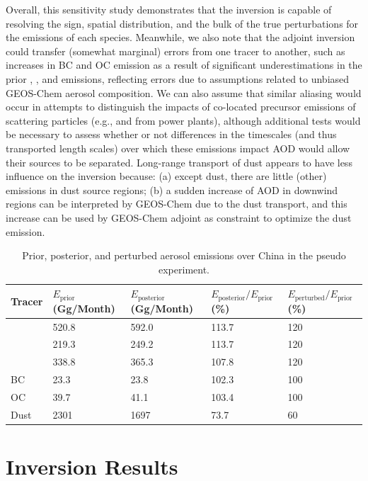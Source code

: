  Overall, this sensitivity study demonstrates that the inversion is capable of resolving the sign,
 spatial distribution, and the bulk of the true perturbations for the emissions of each species.
 Meanwhile, we also note that the adjoint inversion could transfer (somewhat marginal) errors
 from one tracer to another, such as increases in BC and OC emission 
 as a result of significant underestimations in the prior , , and  emissions,
 reflecting errors due to assumptions related to unbiased GEOS-Chem aerosol composition.
 We can also assume that similar aliasing would occur in attempts 
 to distinguish the impacts of co-located precursor emissions of scattering particles
 (e.g.,  and  from power plants),
 although additional tests would be necessary to assess whether or not differences 
 in the timescales (and thus transported length scales) 
 over which these emissions impact AOD would allow their sources to be separated.
 Long-range transport of dust appears to have less influence on the inversion because:
 (a) except dust, there are little (other) emissions in dust source regions;
 (b) a sudden increase of AOD in downwind regions can be interpreted by GEOS-Chem
 due to the dust transport, and this increase can be used by GEOS-Chem adjoint
  as constraint to optimize the dust emission.

\begin{table}[t]
  \centering
  \small
  \caption{Prior, posterior, and perturbed aerosol emissions over China in the pseudo experiment.}
  \label{tab:pseudo1}
  \begin{tabular}{m{3em} C{5em} C{5em} C{6em} C{6em}}
    \toprule
    Tracer & $E_\text{prior}$ (Gg/Month) & $E_\text{posterior}$ (Gg/Month)& $E_\text{posterior}/E_\text{prior}$ (\%)& $E_\text{perturbed}/E_\text{prior}$ (\%)\\ 
    \midrule
     & 520.8 & 592.0 & 113.7 & 120 \\
     & 219.3 & 249.2 & 113.7 & 120 \\
     & 338.8 & 365.3 & 107.8 & 120 \\
    BC & 23.3 & 23.8 & 102.3 & 100 \\
    OC & 39.7 & 41.1 & 103.4 & 100 \\
    Dust & 2301 & 1697 & 73.7 & 60 \\ 
    \bottomrule
  \end{tabular}
\end{table}

\section{Inversion Results} \label{sec:invresult}

